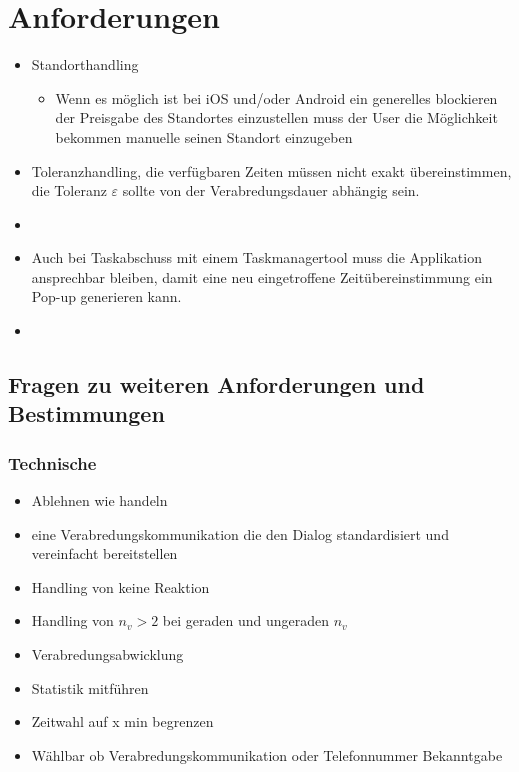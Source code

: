 
\chapter{Anforderungen}

\begin{itemize}
\item Standorthandling
\begin{itemize}
\item Wenn es möglich ist bei iOS und/oder Android ein generelles blockieren der Preisgabe des Standortes einzustellen muss der User die Möglichkeit bekommen manuelle seinen Standort einzugeben
\end{itemize}
\item Toleranzhandling, die verfügbaren Zeiten müssen nicht exakt übereinstimmen, die Toleranz $\varepsilon$ sollte von der Verabredungsdauer abhängig sein.
\item {}
\item Auch bei Taskabschuss mit einem Taskmanagertool muss die Applikation ansprechbar bleiben, damit eine neu eingetroffene Zeitübereinstimmung ein Pop-up generieren kann.
\item {} 
\end{itemize}




\section{Fragen zu weiteren Anforderungen und Bestimmungen}

\subsection{Technische}


\begin{itemize}
\item Ablehnen wie handeln
\item eine Verabredungskommunikation die den Dialog standardisiert und vereinfacht bereitstellen
\item Handling von keine Reaktion
\item Handling von $n_v>2$ bei geraden und ungeraden $n_v$
\item Verabredungsabwicklung
\item Statistik mitführen
\item Zeitwahl auf x min begrenzen
\item Wählbar ob Verabredungskommunikation oder Telefonnummer Bekanntgabe
\end{itemize}


